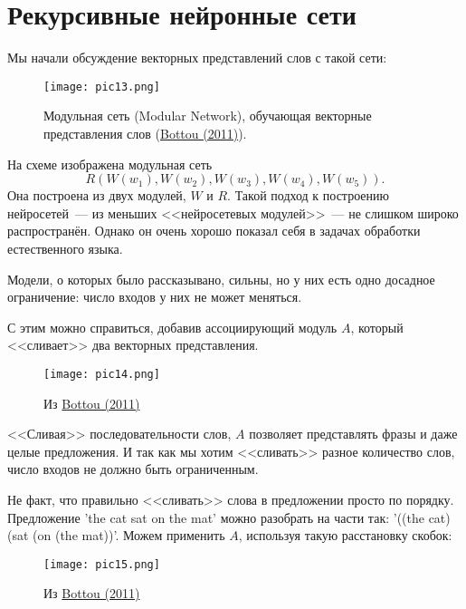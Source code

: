 \documentclass[a4paper,12pt]{article}
\begin{document}
\section*{Рекурсивные нейронные сети}

Мы начали обсуждение векторных представлений слов с такой сети:

\begin{figure}[t]
\begin{center}
\texttt{[image: pic13.png]}
\caption{Модульная сеть (Modular Network), обучающая векторные представления слов (\href{http://arxiv.org/pdf/1102.1808v3.pdf}{Bottou (2011)}).}
\end{center}
\end{figure}

На схеме изображена модульная сеть $$R(W(w_1), W(w_2), W(w_3), W(w_4), W(w_5)).$$ Она построена из двух модулей, $W$ и $R$. Такой подход к построению нейросетей~--- из меньших <<нейросетевых модулей>>~--- не слишком широко распространён. Однако он очень хорошо показал себя в задачах обработки естественного языка.


Модели, о которых было рассказывано, сильны, но у них есть одно досадное ограничение: число входов у них не может меняться.

С этим можно справиться, добавив ассоциирующий модуль $A$, который  <<сливает>> два векторных представления.


\begin{figure}[t]
\begin{center}
\texttt{[image: pic14.png]}
\caption{Из \href{http://arxiv.org/pdf/1102.1808v3.pdf}{Bottou (2011)}}
\end{center}
\end{figure}

<<Сливая>> последовательности слов, $A$ позволяет представлять фразы и даже целые предложения. И так как мы хотим <<сливать>> разное количество слов, число входов не должно быть ограниченным.

Не факт, что правильно <<сливать>> слова в предложении просто по порядку. Предложение 'the cat sat on the mat' можно разобрать на части так: '((the cat) (sat (on (the mat))'. Можем применить $A$, используя такую расстановку скобок:

\begin{figure}[t]
\begin{center}
\texttt{[image: pic15.png]}
\caption{Из \href{http://arxiv.org/pdf/1102.1808v3.pdf}{Bottou (2011)}}
\end{center}
\end{figure}
\end{document}
